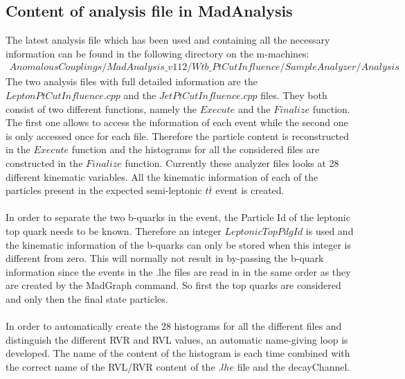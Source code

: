 \subsection{Content of analysis file in MadAnalysis}
The latest analysis file which has been used and containing all the necessary information can be found in the following directory on the m-machines:
\begin{eqnarray*}
  AnomalousCouplings/MadAnalysis\_v112/Wtb\_PtCutInfluence/SampleAnalyzer/Analysis 
\end{eqnarray*}
The two analysis files with full detailed information are the $LeptonPtCutInfluence.cpp$ and the $JetPtCutInfluence.cpp$ files.
They both consist of two different functions, namely the $Execute$ and the $Finalize$ function. The first one allows to access the information of each event while the second one is only accessed once for each file.
Therefore the particle content is reconstructed in the $Execute$ function and the histograms for all the considered files are constructed in the $Finalize$ function.
Currently these analyzer files looks at 28 different kinematic variables. All the kinematic information of each of the particles present in the expected semi-leptonic $t\bar{t}$ event is created.\\
\\
In order to separate the two b-quarks in the event, the Particle Id of the leptonic top quark needs to be known. Therefore an integer $LeptonicTopPdgId$ is used and the kinematic information of the b-quarks can only be stored when this integer is different from zero.
This will normally not result in by-passing the b-quark information since the events in the .lhe files are read in in the same order as they are created by the MadGraph command. So first the top quarks are considered and only then the final state particles.\\
\\
In order to automatically create the 28 histograms for all the different files and distinguish the different RVR and RVL values, an automatic name-giving loop is developed. The name of the content of the histogram is each time combined with the correct name of the RVL/RVR content of the $.lhe$ file and the decayChannel.

